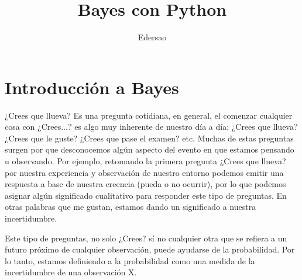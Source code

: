 \documentclass[a4paper,10pt]{article}
\title{Bayes con Python}
\author{Edersao}
\begin{document}
\section{ Introducción a Bayes}
¿Crees que llueva? Es una pregunta cotidiana, en general, el comenzar cualquier cosa con ¿Crees...? es algo muy inherente de nuestro día a día: ¿Crees que llueva? ¿Crees que le guste? ¿Crees que pase el examen? etc. Muchas de estas preguntas surgen por que desconocemos algún aspecto del evento en que estamos pensando u observando. Por ejemplo, retomando la primera pregunta ¿Crees que llueva? por nuestra experiencia y observación de nuestro entorno podemos emitir una respuesta a base de nuestra creencia (pueda o no ocurrir), por lo que podemos  asignar algún  significado cualitativo para responder este tipo de preguntas. En otras palabras que me gustan, estamos dando un significado a nuestra incertidumbre.

Este tipo de preguntas,  no solo ¿Crees? sí no cualquier otra que se refiera a un futuro próximo de cualquier observación, puede ayudarse de la probabilidad. 
Por lo tanto, estamos definiendo a la probabilidad como una medida de la incertidumbre de una observación X.
 
\end{document}
